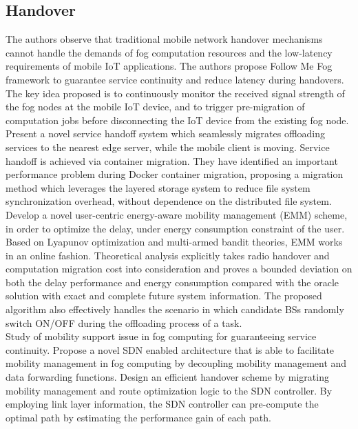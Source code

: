 \subsection{Handover}

\cite{bao2017follow}
The authors observe that traditional mobile network handover mechanisms cannot handle the demands of fog computation resources and the low-latency requirements of mobile IoT applications. The authors propose Follow Me Fog framework to guarantee service continuity and reduce latency during handovers. The key idea proposed is to continuously monitor the received signal strength of the fog nodes at the mobile IoT device, and to trigger pre-migration of computation jobs before disconnecting the IoT device from the existing fog node.\\

\cite{ma2017efficient}
Present a novel service handoff system which seamlessly migrates offloading services to the nearest edge server, while the mobile client is moving. Service handoff is achieved via container migration. They have identified an important performance problem during Docker container migration, proposing a migration method which leverages the layered storage system to reduce file system synchronization overhead, without dependence on the distributed file system.\\

\cite{sun2017emm}
Develop a novel user-centric energy-aware mobility management (EMM) scheme, in order to optimize the delay, under energy consumption constraint of the user. Based on Lyapunov optimization and multi-armed bandit theories, EMM works in an online fashion. Theoretical analysis explicitly takes radio handover and computation migration cost into consideration and proves a bounded deviation on both the delay performance and energy consumption compared with the oracle solution with exact and complete future system information. The proposed algorithm also effectively handles the scenario in which candidate BSs randomly switch ON/OFF during the offloading process of a task.\\

\cite{bi2018mobility}
Study of mobility support issue in fog computing for guaranteeing service continuity. Propose a novel SDN enabled architecture that is able to facilitate mobility management in fog computing by decoupling mobility management and data forwarding functions. Design an efficient handover scheme by migrating mobility management and route optimization logic to the SDN controller. By employing link layer information, the SDN controller can pre-compute the optimal path by estimating the performance gain of each path.\\


